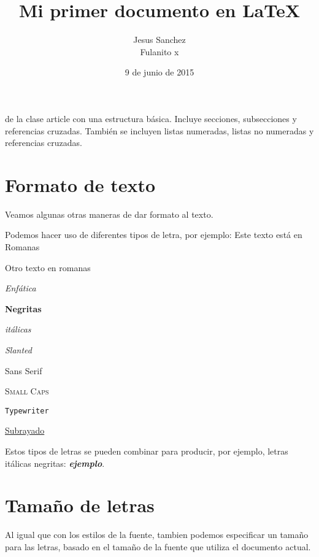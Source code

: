 \documentclass[letterpaper,12pt]{article}
\title{{\color{blue} Mi primer documento en \LaTeX{}}}
\author{Jesus Sanchez\\Fulanito x}
\date{9 de junio de 2015}
\begin{document}
\maketitle

{} de la clase {\ttfamily article} con una estructura básica. 
Incluye secciones, subsecciones y referencias cruzadas. También se incluyen listas numeradas,
listas no numeradas y referencias cruzadas.


\section{Formato de texto}

Veamos algunas otras maneras de dar formato al texto.

Podemos hacer uso de diferentes tipos de letra, por ejemplo:
\textrm{Este texto está en Romanas}

{\rm Otro texto en romanas}

\smallskip

\emph{Enfática}

\smallskip

\textbf{Negritas}

\medskip

\textit{itálicas}

\bigskip

\textsl{Slanted}

\smallskip

\textsf{Sans Serif}

\smallskip

\textsc{Small Caps}

\smallskip

\texttt{Typewriter}

\underline{Subrayado}

Estos tipos de letras se pueden combinar para producir, por ejemplo, letras itálicas negritas: \textbf{\textit{ejemplo}}.


\section{Tamaño de letras}
\begin{doublespacing}
Al igual que con los estilos de la fuente, tambien podemos especificar un tamaño para las letras, basado en el tamaño de la fuente que utiliza el documento actual.
\end{doublespacing}
\end{document}
